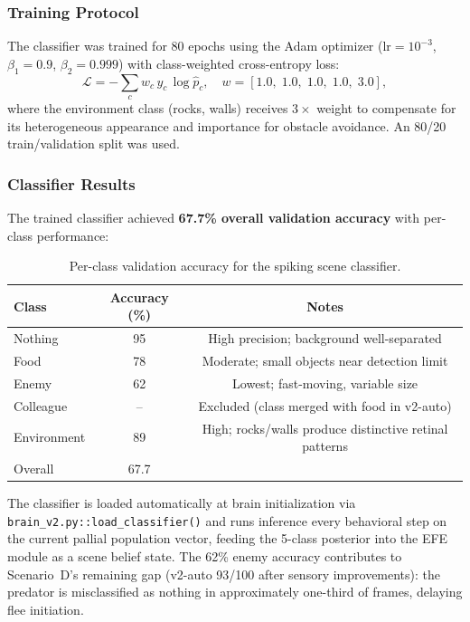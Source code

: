 \documentclass[11pt,a4paper]{article}
\begin{document}
\subsubsection{Training Protocol}

The classifier was trained for 80 epochs using the Adam optimizer
($\text{lr} = 10^{-3}$, $\beta_1 = 0.9$, $\beta_2 = 0.999$) with
class-weighted cross-entropy loss:
\begin{equation}\label{eq:classifier_loss}
  \mathcal{L} = -\sum_{c} w_c\,y_c\,\log\hat{p}_c,
  \quad w = [1.0,\;1.0,\;1.0,\;1.0,\;3.0],
\end{equation}
where the environment class (rocks, walls) receives $3\times$ weight
to compensate for its heterogeneous appearance and importance for
obstacle avoidance.
An 80/20 train/validation split was used.

\subsubsection{Classifier Results}

The trained classifier achieved \textbf{67.7\% overall validation accuracy}
with per-class performance:

\begin{table}[H]
\centering
\caption{Per-class validation accuracy for the spiking scene classifier.}
\label{tab:classifier_results}
\begin{tabular}{lcc}
\toprule
Class & Accuracy (\%) & Notes \\
\midrule
Nothing       & 95 & High precision; background well-separated \\
Food          & 78 & Moderate; small objects near detection limit \\
Enemy         & 62 & Lowest; fast-moving, variable size \\
Colleague     & -- & Excluded (class merged with food in v2-auto) \\
Environment   & 89 & High; rocks/walls produce distinctive retinal patterns \\
\midrule
Overall       & 67.7 & \\
\bottomrule
\end{tabular}
\end{table}

The classifier is loaded automatically at brain initialization via
\texttt{brain\_v2.py::load\_classifier()} and runs inference every
behavioral step on the current pallial population vector, feeding
the 5-class posterior into the EFE module as a scene belief state.
The 62\% enemy accuracy contributes to Scenario~D's remaining gap
(v2-auto 93/100 after sensory improvements): the predator is misclassified
as nothing in approximately one-third of frames, delaying flee initiation.
\end{document}
